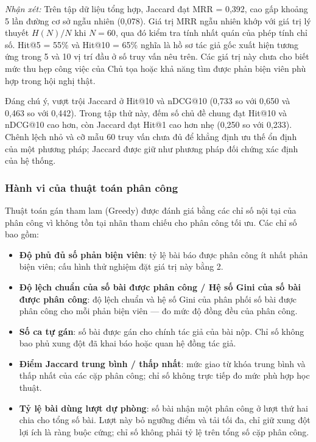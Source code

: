 \textit{Nhận xét:} Trên tập dữ liệu tổng hợp, Jaccard đạt MRR = 0,392, cao gấp khoảng 5 lần đường cơ sở ngẫu nhiên (0,078). Giá trị MRR ngẫu nhiên khớp với giá trị lý thuyết $H(N)/N$ khi $N=60$, qua đó kiểm tra tính nhất quán của phép tính chỉ số. Hit@5 = 55\% và Hit@10 = 65\% nghĩa là hồ sơ tác giả gốc xuất hiện tương ứng trong 5 và 10 vị trí đầu ở số truy vấn nêu trên. Các giá trị này chưa cho biết mức thu hẹp công việc của Chủ tọa hoặc khả năng tìm được phản biện viên phù hợp trong hội nghị thật.

Đáng chú ý,  vượt trội Jaccard ở Hit@10 và nDCG@10 (0,733 so với 0,650 và 0,463 so với 0,442). Trong tập thử này, đếm số chủ đề chung đạt Hit@10 và nDCG@10 cao hơn, còn Jaccard đạt Hit@1 cao hơn nhẹ (0,250 so với 0,233). Chênh lệch nhỏ và cỡ mẫu 60 truy vấn chưa đủ để khẳng định ưu thế ổn định của một phương pháp; Jaccard được giữ như phương pháp đối chứng xác định của hệ thống.

\subsubsection{Hành vi của thuật toán phân công}

Thuật toán gán tham lam (Greedy) được đánh giá bằng các chỉ số nội tại của phân công vì không tồn tại nhãn tham chiếu cho phân công tối ưu. Các chỉ số bao gồm:

\begin{itemize}
  \item \textbf{Độ phủ đủ số phản biện viên}: tỷ lệ bài báo được phân công ít nhất  phản biện viên; cấu hình thử nghiệm đặt giá trị này bằng 2.
  \item \textbf{Độ lệch chuẩn của số bài được phân công / Hệ số Gini của số bài được phân công}: độ lệch chuẩn và hệ số Gini của phân phối số bài được phân công cho mỗi phản biện viên --- đo mức độ đồng đều của phân công.
  \item \textbf{Số ca tự gán}: số bài được gán cho chính tác giả của bài nộp. Chỉ số không bao phủ xung đột đã khai báo hoặc quan hệ đồng tác giả.
  \item \textbf{Điểm Jaccard trung bình / thấp nhất}: mức giao từ khóa trung bình và thấp nhất của các cặp phân công; chỉ số không trực tiếp đo mức phù hợp học thuật.
  \item \textbf{Tỷ lệ bài dùng lượt dự phòng}: số bài nhận một phân công ở lượt thứ hai chia cho tổng số bài. Lượt này bỏ ngưỡng điểm và tải tối đa, chỉ giữ xung đột lợi ích là ràng buộc cứng; chỉ số không phải tỷ lệ trên tổng số cặp phân công.
\end{itemize}


